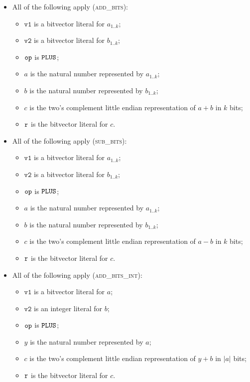\documentclass{book}
\newcommand\vvone[0]{\texttt{v1}}
\newcommand\vvtwo[0]{\texttt{v2}}
\begin{document}
\begin{itemize}
  \item All of the following apply (\textsc{add\_bits}):
  \begin{itemize}
    \item $\vvone$ is a bitvector literal for $a_{1..k}$;
    \item $\vvtwo$ is a bitvector literal for $b_{1..k}$;
    \item $\texttt{op}$ is $\texttt{PLUS}$;
    \item $a$ is the natural number represented by $a_{1..k}$;
    \item $b$ is the natural number represented by $b_{1..k}$;
    \item $c$ is the two's complement little endian representation of $a+b$ in $k$ bits;
    \item $\texttt{r}$ is the bitvector literal for $c$.
  \end{itemize}

  \item All of the following apply (\textsc{sub\_bits}):
  \begin{itemize}
    \item $\vvone$ is a bitvector literal for $a_{1..k}$;
    \item $\vvtwo$ is a bitvector literal for $b_{1..k}$;
    \item $\texttt{op}$ is $\texttt{PLUS}$;
    \item $a$ is the natural number represented by $a_{1..k}$;
    \item $b$ is the natural number represented by $b_{1..k}$;
    \item $c$ is the two's complement little endian representation of $a-b$ in $k$ bits;
    \item $\texttt{r}$ is the bitvector literal for $c$.
  \end{itemize}

  \item All of the following apply (\textsc{add\_bits\_int}):
  \begin{itemize}
    \item $\vvone$ is a bitvector literal for $a$;
    \item $\vvtwo$ is an integer literal for $b$;
    \item $\texttt{op}$ is $\texttt{PLUS}$;
    \item $y$ is the natural number represented by $a$;
    \item $c$ is the two's complement little endian representation of $y+b$ in $|a|$ bits;
    \item $\texttt{r}$ is the bitvector literal for $c$.
  \end{itemize}


\end{itemize}
\end{document}
